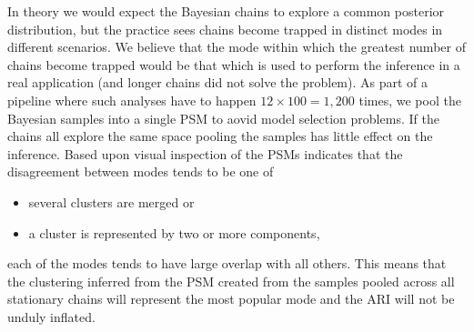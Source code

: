 \documentclass{bioinfo}
\begin{document}
In theory we would expect the Bayesian chains to explore a common posterior distribution, but the practice sees chains become trapped in distinct modes in different scenarios. We believe that the mode within which the greatest number of chains become trapped would be that which is used to perform the inference in a real application (and longer chains did not solve the problem). As part of a pipeline where such analyses have to happen $12 \times 100 = 1,200$ times, we pool the Bayesian samples into a single PSM to aovid model selection problems. If the chains all explore the same space pooling the samples has little effect on the inference. Based upon visual inspection of the PSMs indicates that the disagreement between modes tends to be one of 
\begin{itemize}
	\item several clusters are merged or
	\item a cluster is represented by two or more components,
\end{itemize}
each of the modes tends to have large overlap with all others. This means that the clustering inferred from the PSM created from the samples pooled across all stationary chains will represent the most popular mode and the ARI will not be unduly inflated.
\end{document}
